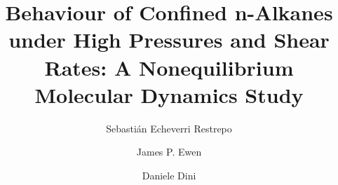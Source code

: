 \documentclass[5p]{elsarticle}
\begin{document}

\title{Behaviour of Confined n-Alkanes under High Pressures and Shear Rates: A Nonequilibrium Molecular Dynamics Study}


\author[SKF,KCL]{Sebasti\'{a}n Echeverri Restrepo}
\author[IC]{James P. Ewen}
\author[IC]{Daniele Dini}
\address[SKF]{SKF Research \& Technology Development (RTD), SKF B.V., Nieuwegein, The Netherlands}
\address[KCL]{Department of Physics, King's College London, Strand, London WC2R 2LS, UK}
\address[IC]{Department of Mechanical Engineering, Imperial College London, London SW7 2AZ, England, UK}

\end{document}
